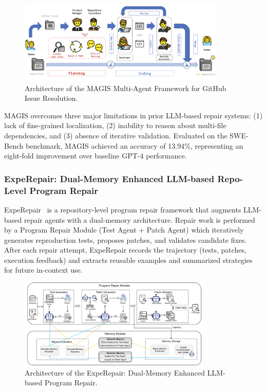 \begin{figure}[h!]
    \centering
    \includegraphics[width=0.88\textwidth]{figures/magis-architecture.png}
    \caption{Architecture of the MAGIS Multi-Agent Framework for GitHub Issue Resolution.}
    \label{fig:magis_architecture}
\end{figure}

MAGIS overcomes three major limitations in prior LLM-based repair systems:
(1) lack of fine-grained localization,  
(2) inability to reason about multi-file dependencies, and  
(3) absence of iterative validation.  
Evaluated on the SWE-Bench benchmark, MAGIS achieved an accuracy of 13.94\%, representing an eight-fold improvement over baseline GPT-4 performance.

\subsubsection{ExpeRepair: Dual-Memory Enhanced LLM-based Repo-Level Program Repair}

ExpeRepair~\cite{mu2025expeRepair} is a repository-level program repair framework that augments LLM-based repair agents with a dual-memory architecture. Repair work is performed by a Program Repair Module (Test Agent + Patch Agent) which iteratively generates reproduction tests, proposes patches, and validates candidate fixes. After each repair attempt, ExpeRepair records the trajectory (tests, patches, execution feedback) and extracts reusable examples and summarized strategies for future in-context use.

\begin{figure}[H]
    \centering
    \includegraphics[width=0.82\textwidth]{figures/experepair-overview.png}
    \caption{Architecture of the ExpeRepair: Dual-Memory Enhanced LLM-based Program Repair.}
    \label{fig:expeRepair_architecture}
\end{figure}

